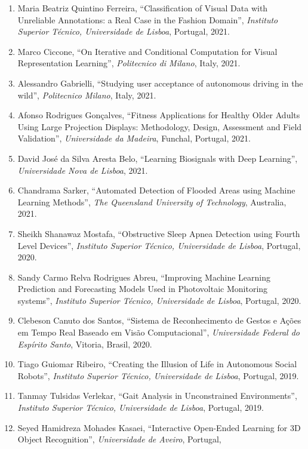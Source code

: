 \begin{enumerate}
  2022.
\item
  Maria Beatriz Quintino Ferreira, ``Classification of Visual Data with
  Unreliable Annotations: a Real Case in the Fashion Domain'',
  \emph{Instituto Superior Técnico, Universidade de Lisboa}, Portugal,
  2021.
\item
  Marco Ciccone, ``On Iterative and Conditional Computation for Visual
  Representation Learning'', \emph{Politecnico di Milano}, Italy, 2021.
\item
  Alessandro Gabrielli, ``Studying user acceptance of autonomous driving
  in the wild'', \emph{Politecnico Milano}, Italy, 2021.
\item
  Afonso Rodrigues Gonçalves, ``Fitness Applications for Healthy Older
  Adults Using Large Projection Displays: Methodology, Design,
  Assessment and Field Validation'', \emph{Universidade da Madeira},
  Funchal, Portugal, 2021.
\item
  David José da Silva Aresta Belo, ``Learning Biosignals with Deep
  Learning'', \emph{Universidade Nova de Lisboa}, 2021.
\item
  Chandrama Sarker, ``Automated Detection of Flooded Areas using Machine
  Learning Methods'', \emph{The Queensland University of Technology},
  Australia, 2021.
\item
  Sheikh Shanawaz Mostafa, ``Obstructive Sleep Apnea Detection using
  Fourth Level Devices'', \emph{Instituto Superior Técnico, Universidade
  de Lisboa}, Portugal, 2020.
\item
  Sandy Carmo Relva Rodrigues Abreu, ``Improving Machine Learning
  Prediction and Forecasting Models Used in Photovoltaic Monitoring
  systems'', \emph{Instituto Superior Técnico, Universidade de Lisboa},
  Portugal, 2020.
\item
  Clebeson Canuto dos Santos, ``Sistema de Reconhecimento de Gestos e
  Ações em Tempo Real Baseado em Visão Computacional'',
  \emph{Universidade Federal do Espírito Santo}, Vitoria, Brasil, 2020.
\item
  Tiago Guiomar Ribeiro, ``Creating the Illusion of Life in Autonomous
  Social Robots'', \emph{Instituto Superior Técnico, Universidade de
  Lisboa}, Portugal, 2019.
\item
  Tanmay Tulsidas Verlekar, ``Gait Analysis in Unconstrained
  Environments'', \emph{Instituto Superior Técnico, Universidade de
  Lisboa}, Portugal, 2019.
\item
  Seyed Hamidreza Mohades Kasaei, ``Interactive Open-Ended Learning for
  3D Object Recognition'', \emph{Universidade de Aveiro}, Portugal,

\end{enumerate}
